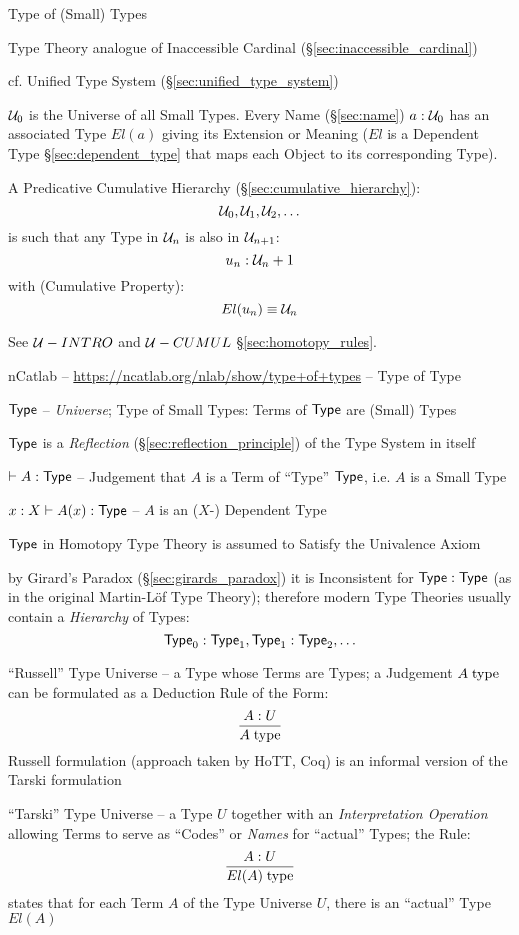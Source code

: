 Type of (Small) Types

Type Theory analogue of Inaccessible Cardinal
(\S\ref{sec:inaccessible_cardinal})

\fist cf. Unified Type System (\S\ref{sec:unified_type_system})

$\mathcal{U}_0$ is the Universe of all Small Types. Every Name
(\S\ref{sec:name}) $a:\mathcal{U}_0$ has an associated Type $El(a)$
giving its Extension or Meaning ($El$ is a Dependent Type
\S\ref{sec:dependent_type} that maps each Object to its corresponding
Type).

A Predicative Cumulative Hierarchy (\S\ref{sec:cumulative_hierarchy}):
\[
  \mathcal{U}_0, \mathcal{U}_1, \mathcal{U}_2, \ldots
\]
is such that any Type in $\mathcal{U}_n$ is also in
$\mathcal{U}_{n+1}$:
\[
  u_n:\mathcal{U}_n+1
\]
with (Cumulative Property):
\[
  El(u_n) \equiv \mathcal{U}_n
\]

\fist See $\mathcal{U}-INTRO$ and $\mathcal{U}-CUMUL$
\S\ref{sec:homotopy_rules}.

\asterism

nCatlab -- \url{https://ncatlab.org/nlab/show/type+of+types} -- Type of
Type

$\mathsf{Type}$ -- \emph{Universe}; Type of Small Types: Terms of $\mathsf{Type}$ are
(Small) Types

$\mathsf{Type}$ is a \emph{Reflection} (\S\ref{sec:reflection_principle}) of
the Type System in itself

$\vdash A:\mathsf{Type}$ -- Judgement that $A$ is a Term of ``Type'' $\mathsf{Type}$,
i.e. $A$ is a Small Type

$x:X \vdash A(x):\mathsf{Type}$ -- $A$ is an ($X$-) Dependent Type

$\mathsf{Type}$ in Homotopy Type Theory is assumed to Satisfy the Univalence
Axiom

by Girard's Paradox (\S\ref{sec:girards_paradox}) it is Inconsistent
for $\mathsf{Type} : \mathsf{Type}$ (as in the original Martin-L\"of Type Theory);
therefore modern Type Theories usually contain a \emph{Hierarchy} of
Types:
\[
  \mathsf{Type}_0 : \mathsf{Type}_1, \mathsf{Type}_1 : \mathsf{Type}_2, \ldots
\]

``Russell'' Type Universe -- a Type whose Terms are Types; a Judgement
$A \;\mathrm{type}$ can be formulated as a Deduction Rule of the Form:
\[
  \frac{A:U}{A \;\mathrm{type}}
\]
Russell formulation (approach taken by HoTT, Coq) is an informal
version of the Tarski formulation

``Tarski'' Type Universe -- a Type $U$ together with an
\emph{Interpretation Operation} allowing Terms to serve as ``Codes''
or \emph{Names} for ``actual'' Types; the Rule:
\[
  \frac{A:U}{El(A) \;\mathrm{type}}
\]
states that for each Term $A$ of the Type Universe $U$, there is an
``actual'' Type $El(A)$

